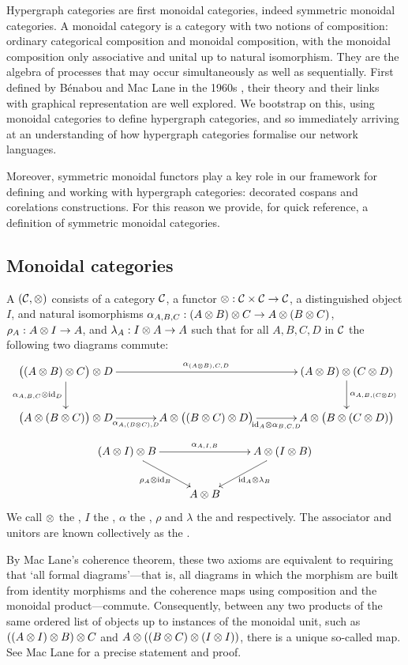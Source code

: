 Hypergraph categories are first monoidal categories, indeed symmetric monoidal
categories.  A monoidal category is a category with two notions of composition:
ordinary categorical composition and monoidal composition, with the monoidal
composition only associative and unital up to natural isomorphism. They are the
algebra of processes that may occur simultaneously as well as sequentially.
First defined by B\'enabou and Mac Lane in the 1960s \cite{Ben63, Mac63}, their
theory and their links with graphical representation are well explored. We
bootstrap on this, using monoidal categories to define hypergraph categories,
and so immediately arriving at an understanding of how hypergraph categories
formalise our network languages. 

Moreover, symmetric monoidal functors play a key role in our framework for
defining and working with hypergraph categories: decorated cospans and
corelations constructions. For this reason we provide, for quick reference, a
definition of symmetric monoidal categories.


\subsection{Monoidal categories}
A  $({\mathcal{C}}, \otimes)$ consists of a category ${\mathcal{C}}$, a
functor $\otimes: {\mathcal{C}} \times {\mathcal{C}} \to {\mathcal{C}}$, a distinguished object $I$, and natural
isomorphisms $\alpha_{A,B,C}: (A \otimes B) \otimes C \to A \otimes (B \otimes C)$,
$\rho_A: A \otimes I  \to A$, and $\lambda_A: I \otimes A \to A$ such that for all
$A,B,C,D$ in $\mathcal C$ the following two diagrams commute: 
\[
  \xymatrixcolsep{3pc}
  \xymatrix{
    \big((A \ot B) \ot C\big) \ot D \ar[d]_{\a_{A,B,C}\ot\idn_D} \ar[rr]^{\a_{(A\ot B),C,D}} 
    &&(A \ot B) \ot (C \ot D) \ar[d]^{\a_{A,B,(C\ot D)}} \\
    \big(A \ot (B\ot C)\big) \ot D \ar[r]_{\a_{A,(B\ot C),D}} 
    & A\ot\big((B \ot C)\ot D\big)\ar[r]_{\idn_A \ot \a_{B,C,D}}
    &A \ot \big(B \ot (C \ot D)\big)
  }
\]
\[
  \xymatrix{
    (A\ot I)\ot B  \ar[rr]^{\a_{A,I,B}} \ar[dr]_{\rho_{A}\ot \idn_B} && A \ot (I \ot B) \ar[dl]^{\idn_A\ot \lambda_B}\\
    & A \ot B \\
  }
\]
We call $\otimes$ the , $I$ the ,
$\alpha$ the , $\rho$ and $\lambda$ the  and
 respectively. The associator and unitors are known
collectively as the .

By Mac Lane's coherence theorem, these two axioms are equivalent to requiring
that `all formal diagrams'---that is, all diagrams in which the morphism are
built from identity morphisms and the coherence maps using composition and the
monoidal product---commute. Consequently, between any two products of the same
ordered list of objects up to instances of the monoidal unit, such as $((A \otimes
I) \otimes B) \otimes C$ and $A \otimes ((B \otimes C) \otimes (I \otimes I))$, there is a unique
so-called  map. See Mac Lane \cite[Corollary of Theorem
VII.2.1]{Mac98} for a precise statement and proof.

